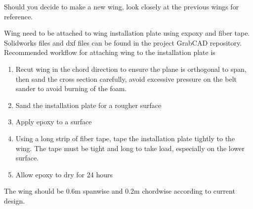 \documentclass[12pt]{article}
\begin{document}
Should you decide to make a new wing, look closely at the previous wings for reference.

Wing need to be attached to wing installation plate using expoxy and fiber tape. Solidworks files and dxf files can be found in the project GrabCAD repository. Recommended workflow for attaching wing to the installation plate is 
\begin{enumerate}
  \item Recut wing in the chord direction to ensure the plane is orthogonal to span, then sand the cross section carefully, avoid excessive pressure on the belt sander to avoid burning of the foam. 
  \item Sand the installation plate for a rougher surface
  \item Apply epoxy to a surface
  \item Using a long strip of fiber tape, tape the installation plate tightly to the wing. The tape must be tight and long to take load, especially on the lower surface.
  \item Allow epoxy to dry for 24 hours
\end{enumerate}

The wing should be 0.6m spanwise and 0.2m chordwise according to current design. 
\end{document}
